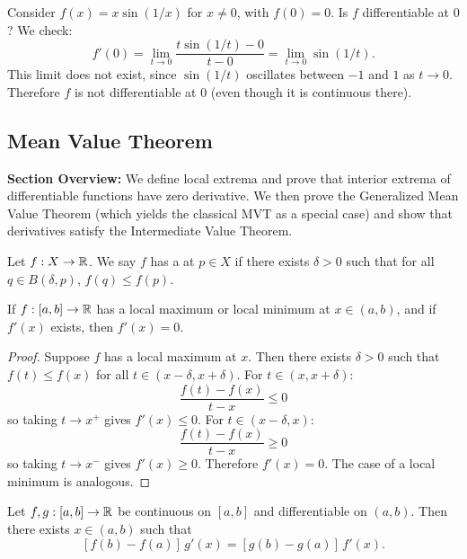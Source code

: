 \documentclass[../master/master.tex]{subfiles}
\begin{document}
\begin{example}
Consider $f(x) = x\sin(1/x)$ for $x \neq 0$, with $f(0) = 0$. Is $f$ differentiable at $0$? We check:
\[
f'(0) = \lim_{t \to 0} \frac{t\sin(1/t) - 0}{t - 0} = \lim_{t \to 0} \sin(1/t).
\]
This limit does not exist, since $\sin(1/t)$ oscillates between $-1$ and $1$ as $t \to 0$. Therefore $f$ is not differentiable at $0$ (even though it is continuous there).

\end{example}

\subsection{Mean Value Theorem}

\begin{summarybox}
\textbf{Section Overview:} We define local extrema and prove that interior extrema of differentiable functions have zero derivative. We then prove the Generalized Mean Value Theorem (which yields the classical MVT as a special case) and show that derivatives satisfy the Intermediate Value Theorem.
\end{summarybox}

\begin{definition}
Let $f: X \to \mathbb{R}$. We say $f$ has a  at $p \in X$ if there exists $\delta > 0$ such that for all $q \in B(\delta, p)$, $f(q) \leq f(p)$.
\end{definition}

\begin{theorem}
If $f: [a,b] \to \mathbb{R}$ has a local maximum or local minimum at $x \in (a,b)$, and if $f'(x)$ exists, then $f'(x) = 0$.
\end{theorem}

\begin{proof}
Suppose $f$ has a local maximum at $x$. Then there exists $\delta > 0$ such that $f(t) \leq f(x)$ for all $t \in (x - \delta, x + \delta)$. For $t \in (x, x + \delta)$:
\[
\frac{f(t) - f(x)}{t - x} \leq 0
\]
so taking $t \to x^+$ gives $f'(x) \leq 0$. For $t \in (x - \delta, x)$:
\[
\frac{f(t) - f(x)}{t - x} \geq 0
\]
so taking $t \to x^-$ gives $f'(x) \geq 0$. Therefore $f'(x) = 0$. The case of a local minimum is analogous.
\end{proof}

\begin{theorem}
Let $f, g: [a,b] \to \mathbb{R}$ be continuous on $[a,b]$ and differentiable on $(a,b)$. Then there exists $x \in (a,b)$ such that
\[
[f(b) - f(a)]\, g'(x) = [g(b) - g(a)]\, f'(x).
\]
\end{theorem}
\end{document}
